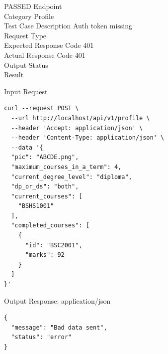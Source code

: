 
\begin{testcase}{6}{PASSED}
Endpoint \hfill {}\\
Category \hfill Profile\\
Test Case Description \hfill Auth token missing\\

Request Type    \hfill {}\\
Expected Response Code    \hfill 401\\
Actual Response Code    \hfill 401\\

Output Status \hfill {}\\
Result \hfill {}

\begin{ipblock}{Input Request}
\begin{verbatim}
curl --request POST \
  --url http://localhost/api/v1/profile \
  --header 'Accept: application/json' \
  --header 'Content-Type: application/json' \
  --data '{
  "pic": "ABCDE.png",
  "maximum_courses_in_a_term": 4,
  "current_degree_level": "diploma",
  "dp_or_ds": "both",
  "current_courses": [
    "BSHS1001"
  ],
  "completed_courses": [
    {
      "id": "BSC2001",
      "marks": 92
    }
  ]
}'
\end{verbatim}
\end{ipblock}

\begin{opblock}{Output Response: application/json}
\begin{verbatim}
{
  "message": "Bad data sent",
  "status": "error"
}
\end{verbatim}
\end{opblock}
\end{testcase}

